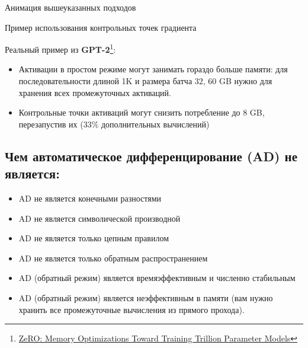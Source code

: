 \documentclass[
  russian,
  letterpaper,
  DIV=11,
  numbers=noendperiod]{scrartcl}
\providecommand{\tightlist}{%
  \setlength{\itemsep}{0pt}\setlength{\parskip}{0pt}}
\begin{document}
Анимация вышеуказанных подходов
\href{https://github.com/cybertronai/gradient-checkpointing}{\faGithub}

Пример использования контрольных точек градиента
\href{https://colab.research.google.com/github/oseledets/dl2023/blob/main/seminars/seminar-10/Large_model_training_practice.ipynb}{\faGithub}

Реальный пример из \textbf{GPT-2}\footnote{\href{https://arxiv.org/abs/1910.02054}{ZeRO:
  Memory Optimizations Toward Training Trillion Parameter Models}}:

\begin{itemize}
\tightlist
\item
  Активации в простом режиме могут занимать гораздо больше памяти: для
  последовательности длиной 1K и размера батча \(32\), \(60\) GB нужно
  для хранения всех промежуточных активаций.
\item
  Контрольные точки активаций могут снизить потребление до 8 GB,
  перезапустив их (33\% дополнительных вычислений)
\end{itemize}

\subsection{Чем автоматическое дифференцирование (AD) не
является:}\label{ux447ux435ux43c-ux430ux432ux442ux43eux43cux430ux442ux438ux447ux435ux441ux43aux43eux435-ux434ux438ux444ux444ux435ux440ux435ux43dux446ux438ux440ux43eux432ux430ux43dux438ux435-ad-ux43dux435-ux44fux432ux43bux44fux435ux442ux441ux44f}

\begin{itemize}
\tightlist
\item
  AD не является конечными разностями
\item
  AD не является символической производной
\item
  AD не является только цепным правилом
\item
  AD не является только обратным распространением
\item
  AD (обратный режим) является времяэффективным и численно стабильным
\item
  AD (обратный режим) является неэффективным в памяти (вам нужно хранить
  все промежуточные вычисления из прямого прохода).
\end{itemize}
\end{document}
